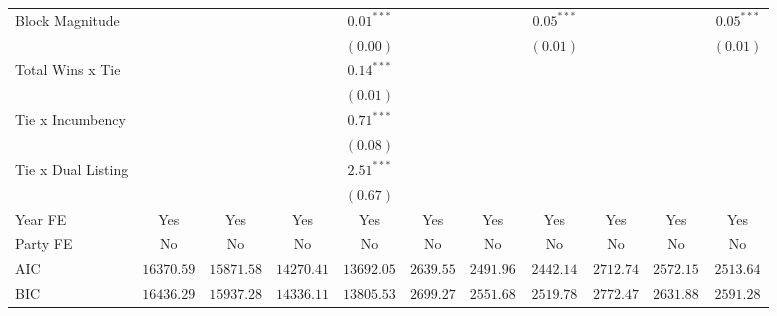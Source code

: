 \begin{table}
\begin{center}
\begin{tabular}{l c c c c c c c c c c}
Block Magnitude    &               &               &               & $0.01^{***}$  &              &              & $0.05^{***}$ &              &              & $0.05^{***}$  \\
                   &               &               &               & $(0.00)$      &              &              & $(0.01)$     &              &              & $(0.01)$      \\
Total Wins x Tie   &               &               &               & $0.14^{***}$  &              &              &              &              &              &               \\
                   &               &               &               & $(0.01)$      &              &              &              &              &              &               \\
Tie x Incumbency   &               &               &               & $0.71^{***}$  &              &              &              &              &              &               \\
                   &               &               &               & $(0.08)$      &              &              &              &              &              &               \\
Tie x Dual Listing &               &               &               & $2.51^{***}$  &              &              &              &              &              &               \\
                   &               &               &               & $(0.67)$      &              &              &              &              &              &               \\
\hline
Year FE            & Yes           & Yes           & Yes           & Yes           & Yes          & Yes          & Yes          & Yes          & Yes          & Yes           \\
Party FE           & No            & No            & No            & No            & No           & No           & No           & No           & No           & No            \\
AIC                & $16370.59$    & $15871.58$    & $14270.41$    & $13692.05$    & $2639.55$    & $2491.96$    & $2442.14$    & $2712.74$    & $2572.15$    & $2513.64$     \\
BIC                & $16436.29$    & $15937.28$    & $14336.11$    & $13805.53$    & $2699.27$    & $2551.68$    & $2519.78$    & $2772.47$    & $2631.88$    & $2591.28$     \\

\end{tabular}
\end{center}
\end{table}
